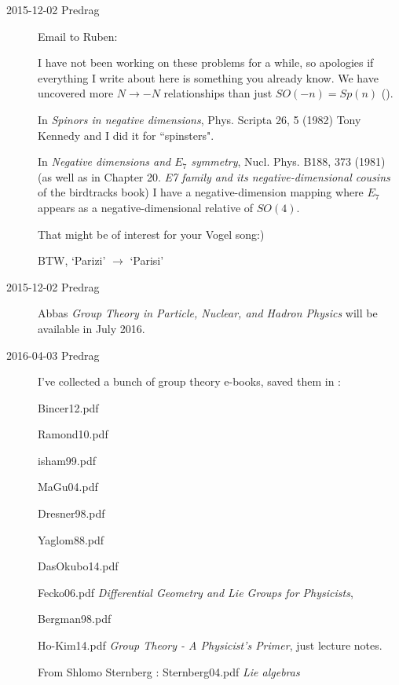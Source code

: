 \begin{description}
\item[2015-12-02  Predrag]
Email to Ruben:

I have not been working on these problems for a while, so apologies if
everything I write about here is something you already know. We have
uncovered more $N \to -N$ relationships than just $SO(-n)=Sp(n)$
().

In {\em Spinors in negative dimensions},
Phys. Scripta 26, 5 (1982) Tony Kennedy and I did it for ``spinsters".

In {\em Negative dimensions and $E_7$ symmetry}, Nucl. Phys. B188, 373
(1981) (as well as in Chapter 20. {\em E7 family and its
negative-dimensional cousins} of the birdtracks book) I have a
negative-dimension mapping where $E_7$  appears as a
negative-dimensional relative of $SO(4)$.

That might be of interest for your Vogel song:)

BTW, `Parizi' $\to$ `Parisi'


\item[2015-12-02  Predrag] Abbas {\em Group Theory
in Particle, Nuclear, and Hadron Physics} will be available in July 2016.

\item[2016-04-03 Predrag] I've collected a bunch of group theory e-books,
saved them in :

Bincer12.pdf

Ramond10.pdf

isham99.pdf

MaGu04.pdf

Dresner98.pdf

Yaglom88.pdf

DasOkubo14.pdf

Fecko06.pdf
{\em Differential Geometry and Lie Groups for Physicists},

Bergman98.pdf

{Ho-Kim14.pdf} {\em  Group Theory - A Physicist's Primer}, just lecture
notes.

From Shlomo Sternberg
:
Sternberg04.pdf {\em Lie algebras}



\end{description}
\renewcommand{\ssp}{a}

